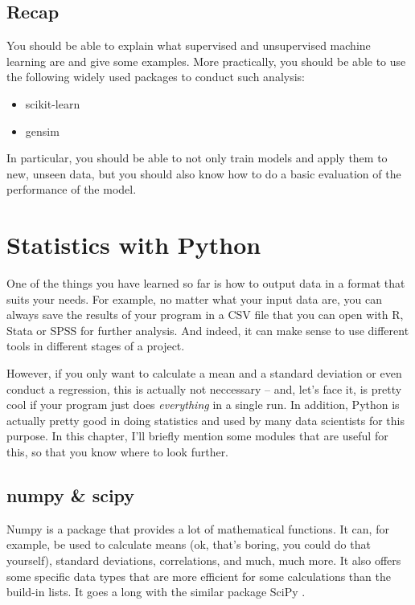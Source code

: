 \documentclass[a4paper,12pt]{book}
\begin{document}
\section{Recap}
You should be able to explain what supervised and unsupervised machine learning are and give some examples. More practically, you should be able to use the following widely used packages to conduct such analysis:
\begin{itemize}
	\item scikit-learn
	\item gensim
\end{itemize}
In particular, you should be able to not only train models and apply them to new, unseen data, but you should also know how to do a basic evaluation of the performance of the model.



\chapter{Statistics with Python}
\label{chap:statistics}
One of the things you have learned so far is how to output data in a format that suits your needs. For example, no matter what your input data are, you can always save the results of your program in a CSV file that you can open with R, Stata or SPSS for further analysis. And indeed, it can make sense to use different tools in different stages of a project.

However, if you only want to calculate a mean and a standard deviation or even conduct a regression, this is actually not neccessary -- and, let's face it, is pretty cool if your program just does \emph{everything} in a single run. In addition, Python is actually pretty good in doing statistics and used by many data scientists for this purpose. In this chapter, I'll briefly mention some modules that are useful for this, so that you know where to look further.


\section{numpy \& scipy}
Numpy \citep{numpy} is a package that provides a lot of mathematical functions. It can, for example, be used to calculate means (ok, that's boring, you could do that yourself), standard deviations, correlations, and much, much more. It also offers some specific data types that are more efficient for some calculations than the build-in lists. It goes a long with the similar package SciPy \citep{scipy}.
\end{document}
